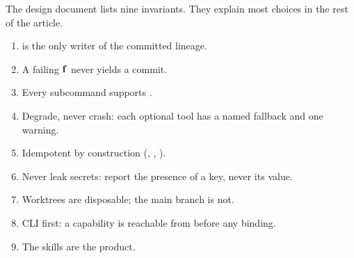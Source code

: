 The design document lists nine invariants. They explain most choices in the rest of the article.
\begin{enumerate}[leftmargin=*,itemsep=1pt]
  \item {} is the only writer of the committed lineage.
  \item A failing $\mathbf{f}$ never yields a commit.
  \item Every subcommand supports .
  \item Degrade, never crash: each optional tool has a named fallback and one warning.
  \item Idempotent by construction (, , ).
  \item Never leak secrets: report the presence of a key, never its value.
  \item Worktrees are disposable; the main branch is not.
  \item CLI first: a capability is reachable from  before any binding.
  \item The skills are the product.
\end{enumerate}
